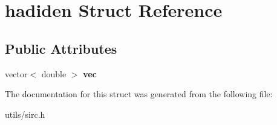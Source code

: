\hypertarget{structhadiden}{}\section{hadiden Struct Reference}
\label{structhadiden}
\subsection*{Public Attributes}
\begin{DoxyCompactItemize}
\item 
\mbox{\label{structhadiden_a02891c8507df0ae77a133138bb358fe2}} 
vector$<$ double $>$ {\bfseries vec}
\end{DoxyCompactItemize}


The documentation for this struct was generated from the following file\+:\begin{DoxyCompactItemize}
\item 
utils/sirc.\+h\end{DoxyCompactItemize}
